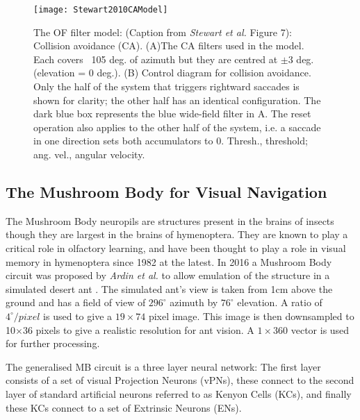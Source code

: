 \documentclass[a4paper,12pt]{article}
\begin{document}
\begin{figure}[h]
 
  \centering
  \texttt{[image: Stewart2010CAModel]}
  \caption{
    \label{fig:stewartca} The OF filter model: (Caption from \textit{Stewart et al.} Figure 7):
    Collision avoidance (CA). (A)The CA filters used in the
    model. Each covers ~105 deg. of azimuth but they are centred
    at $\pm 3$ deg. (elevation = 0 deg.). (B) Control diagram for collision
    avoidance. Only the half of the system that triggers rightward
    saccades is shown for clarity; the other half has an identical
    configuration. The dark blue box represents the blue wide-field
    filter in A. The reset operation also applies to the other half of
    the system, i.e. a saccade in one direction sets both
    accumulators to 0. Thresh., threshold; ang. vel., angular velocity.
  }
 
\end{figure}

\subsection{ The Mushroom Body for Visual Navigation } \label{MBBackground}
The Mushroom Body neuropils are structures present in the brains of insects though they are
largest in the brains of hymenoptera. They are known to play a critical role in olfactory
learning, and have been thought to play a role in visual memory in hymenoptera since 1982
at the latest\cite{Mobbs1982}. In 2016 a Mushroom Body circuit was proposed by \textit{Ardin et al.}
to allow emulation of the structure in a simulated desert ant \cite{Ardin2016}. The simulated
ant's view is taken from 1cm above the ground and has a field of view of $296^{\circ}$ azimuth
by $76^{\circ}$ elevation. A ratio of $4^{\circ}/pixel$ is used to give a $19\times74$ pixel image.
This image is then downsampled to 10$\times$36 pixels to give a realistic resolution for ant vision.
A $1\times360$ vector is used for further processing.
\newline

The generalised MB circuit is a three layer neural network: The first layer consists of a set of
visual Projection Neurons (vPNs), these connect to the second layer of standard artificial neurons
referred to as Kenyon Cells (KCs), and finally these KCs connect to a set of Extrinsic Neurons (ENs).
\newline
\end{document}

